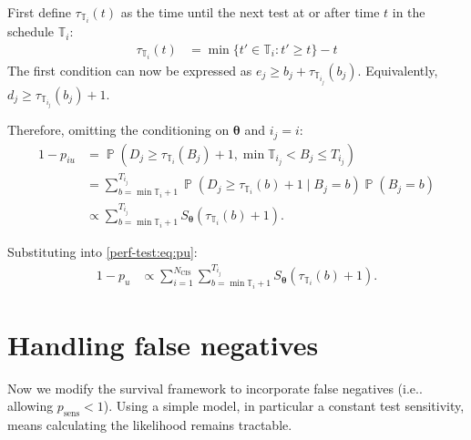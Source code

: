 \documentclass[12pt]{article}
\makeatletter
\DeclareMathOperator{\prob}{\mathbb{P}}
\renewcommand{\vec}[1]{\bm{#1}}
\newcommand{\ssep}{:}
\newcommand{\psens}{p_\text{sens}}
\newcommand{\Ncis}{N_\text{CIS}}
\newcommand{\sched}{\mathbb{T}}
\DeclareRobustCommand\onedot{\futurelet\@let@token\@onedot}
\def\@onedot{\ifx\@let@token.\else.\null\fi\xspace}
\def\ie{i.e\onedot} \def\Ie{{I.e}\onedot}
\makeatother
\begin{document}
First define $\tau_{\sched_i}(t)$ as the time until the next test at or after time $t$ in the schedule $\sched_i$:
\begin{align}
\tau_{\sched_i}(t) &= \min \{ t' \in \sched_i : t' \geq t \} - t
\label{perf-test:eq:tau-def}
\end{align}
The first condition can now be expressed as $e_j \geq b_j + \tau_{\sched_{i_j}}(b_j)$.
Equivalently, $d_j \geq \tau_{\sched_{i_j}}(b_j) + 1$.


Therefore, omitting the conditioning on $\vec{\theta}$ and $i_j = i$:
\begin{align}
1 - p_{iu}
&= \prob(D_j \geq \tau_{\sched_{i}}(B_j)+ 1, \min \sched_{i_j} < B_j \leq T_{i_j}) \\
&= \sum_{b = \min \sched_{i} + 1}^{T_{i_j}} \prob(D_j \geq \tau_{\sched_{i}}(b) + 1 \mid B_j = b) \prob(B_j = b)\\
&\propto \sum_{b = \min \sched_{i} + 1}^{T_{i_j}} S_{\vec{\theta}}(\tau_{\sched_{i}}(b) + 1).
\label{perf-test:eq:piu}
\end{align}

Substituting into \cref{perf-test:eq:pu}:
\begin{align}
1 - p_u
& \propto \sum_{i=1}^{\Ncis} \sum_{b = \min \sched_{i} + 1}^{T_{i_j}} S_{\vec{\theta}}(\tau_{\sched_{i}}(b) + 1).
\end{align}

\section{Handling false negatives} \label{sec:false-negatives}

Now we modify the survival framework to incorporate false negatives (\ie allowing $\psens < 1$).
Using a simple model, in particular a constant test sensitivity, means calculating the likelihood remains tractable.
\end{document}
